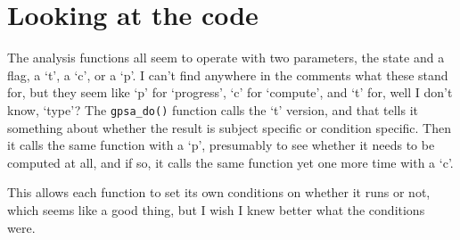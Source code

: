 \documentclass[11pt]{article}
\begin{document}
\section{Looking at the code}

The analysis functions all seem to operate with two parameters, the
state and a flag, a `t', a `c', or a `p'.  I can't find anywhere in
the comments what these stand for, but they seem like `p' for
`progress', `c' for `compute', and `t' for, well I don't know,
`type'?  The \verb+gpsa_do()+ function calls the `t' version, and that
tells it something about whether the result is subject specific or
condition specific.  Then it calls the same function with a `p',
presumably to see whether it needs to be computed at all, and if so,
it calls the same function yet one more time with a `c'.

This allows each function to set its own conditions on whether it runs
or not, which seems like a good thing, but I wish I knew better what
the conditions were.
\end{document}
